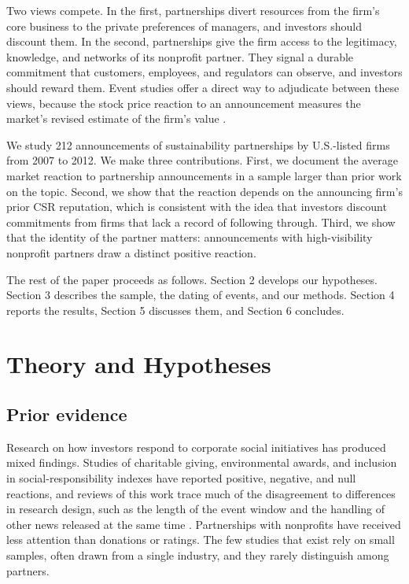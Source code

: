 \documentclass[11pt]{article}
\begin{document}
Two views compete. In the first, partnerships divert resources from the firm's core business to the private preferences of managers, and investors should discount them. In the second, partnerships give the firm access to the legitimacy, knowledge, and networks of its nonprofit partner. They signal a durable commitment that customers, employees, and regulators can observe, and investors should reward them. Event studies offer a direct way to adjudicate between these views, because the stock price reaction to an announcement measures the market's revised estimate of the firm's value \citep{mcwilliams1997,mackinlay1997}.

We study 212 announcements of sustainability partnerships by U.S.-listed firms from 2007 to 2012. We make three contributions. First, we document the average market reaction to partnership announcements in a sample larger than prior work on the topic. Second, we show that the reaction depends on the announcing firm's prior CSR reputation, which is consistent with the idea that investors discount commitments from firms that lack a record of following through. Third, we show that the identity of the partner matters: announcements with high-visibility nonprofit partners draw a distinct positive reaction.

The rest of the paper proceeds as follows. Section 2 develops our hypotheses. Section 3 describes the sample, the dating of events, and our methods. Section 4 reports the results, Section 5 discusses them, and Section 6 concludes.

\section{Theory and Hypotheses}

\subsection{Prior evidence}

Research on how investors respond to corporate social initiatives has produced mixed findings. Studies of charitable giving, environmental awards, and inclusion in social-responsibility indexes have reported positive, negative, and null reactions, and reviews of this work trace much of the disagreement to differences in research design, such as the length of the event window and the handling of other news released at the same time \citep{mcwilliamssiegelteoh1999}. Partnerships with nonprofits have received less attention than donations or ratings. The few studies that exist rely on small samples, often drawn from a single industry, and they rarely distinguish among partners.
\end{document}
